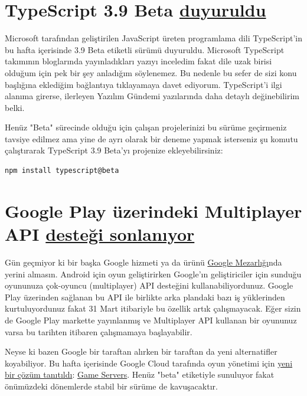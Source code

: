 \documentclass[11pt]{article}
\begin{document}
\section{TypeScript 3.9 Beta \href{https://devblogs.microsoft.com/typescript/announcing-typescript-3-9-beta/}{duyuruldu}}
\label{sec:org01b7531}
Microsoft tarafından geliştirilen JavaScript üreten programlama dili
TypeScript'in bu hafta içerisinde 3.9 Beta etiketli sürümü duyuruldu.
Microsoft TypeScript takımının bloglarında yayınladıkları yazıyı inceledim
fakat dile uzak birisi olduğum için pek bir şey anladığım söylenemez. Bu
nedenle bu sefer de sizi konu başlığına eklediğim bağlantıya tıklayamaya davet
ediyorum. TypeScript'i ilgi alanıma girerse, ilerleyen Yazılım Gündemi
yazılarında daha detaylı değinebilirim belki.

Henüz "Beta" sürecinde olduğu için çalışan projelerinizi bu sürüme geçirmeniz
tavsiye edilmez ama yine de ayrı olarak bir deneme yapmak isterseniz şu komutu
çalıştırarak TypeScript 3.9 Beta'yı projenize ekleyebilirsiniz:
\begin{verbatim}
npm install typescript@beta
\end{verbatim}
\section{Google Play üzerindeki Multiplayer API \href{https://support.google.com/googleplay/android-developer/answer/9469745?hl=en}{desteği sonlanıyor}}
\label{sec:org5eb6354}
Gün geçmiyor ki bir başka Google hizmeti ya da ürünü \href{https://killedbygoogle.com/}{Google Mezarlığı}nda
yerini almasın. Android için oyun geliştirirken Google'ın geliştiriciler için
sunduğu oyununuza çok-oyuncu (multiplayer) API desteğini kullanabiliyordunuz.
Google Play üzerinden sağlanan bu API ile birlikte arka plandaki bazı iş
yüklerinden kurtuluyordunuz fakat 31 Mart itibariyle bu özellik artık
çalışmayacak. Eğer sizin de Google Play markette yayınlanmış ve Multiplayer
API kullanan bir oyununuz varsa bu tarihten itibaren çalışmamaya başlayabilir.

Neyse ki bazen Google bir taraftan alırken bir taraftan da yeni alternatifler
koyabiliyor. Bu hafta içerisinde Google Cloud tarafında oyun yönetimi için
\href{https://cloud.google.com/blog/products/gaming/introducing-google-cloud-game-servers}{yeni bir çözüm tanıtıldı}: \href{https://cloud.google.com/game-servers}{Game Servers}. Henüz "beta" etiketiyle sunuluyor
fakat önümüzdeki dönemlerde stabil bir sürüme de kavuşacaktır.
\end{document}
